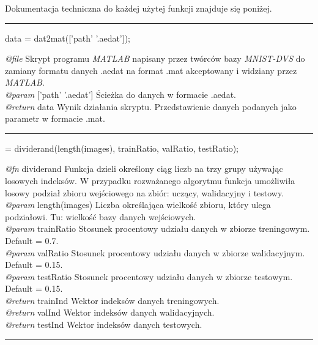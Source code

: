 \noindent Dokumentacja techniczna do każdej użytej funkcji znajduje się poniżej.

\vspace{1cm}
\hrule
\vspace{1cm}

\noindent data = dat2mat(['path' '.aedat']);
\vspace{1cm}

\noindent \textit{@file} Skrypt programu \textit{MATLAB} napisany przez twórców\cite{MNIST_DVS} bazy \textit{MNIST-DVS} do zamiany formatu danych .aedat na format .mat akceptowany i widziany przez \textit{MATLAB}.
\\ \textit{@param} ['path' '.aedat'] Ścieżka do danych w formacie .aedat.
\\ \textit{@return} data Wynik działania skryptu. Przedstawienie danych podanych jako parametr w formacie .mat.

\vspace{1cm}
\hrule
\vspace{1cm}

 = dividerand(length(images), trainRatio, valRatio, testRatio);
\vspace{1cm}

\noindent \textit{@fn} dividerand Funkcja dzieli określony ciąg liczb na trzy grupy używając losowych indeksów. W przypadku rozważanego algorytmu funkcja umożliwiła losowy podział zbioru wejściowego na zbiór: uczący, walidacyjny i testowy.
\\ \textit{@param} length(images) Liczba określająca wielkość zbioru, który ulega podziałowi. Tu: wielkość bazy danych wejściowych.
\\ \textit{@param} trainRatio Stosunek procentowy udziału danych w zbiorze treningowym. Default = 0.7.
\\ \textit{@param} valRatio Stosunek procentowy udziału danych w zbiorze walidacyjnym. Default = 0.15.
\\ \textit{@param} testRatio Stosunek procentowy udziału danych w zbiorze testowym. Default = 0.15.
\\ \textit{@return} trainInd Wektor indeksów danych treningowych.
\\ \textit{@return} valInd Wektor indeksów danych walidacyjnych.
\\ \textit{@return} testInd Wektor indeksów danych testowych.

\vspace{1cm}
\hrule
\vspace{1cm}

